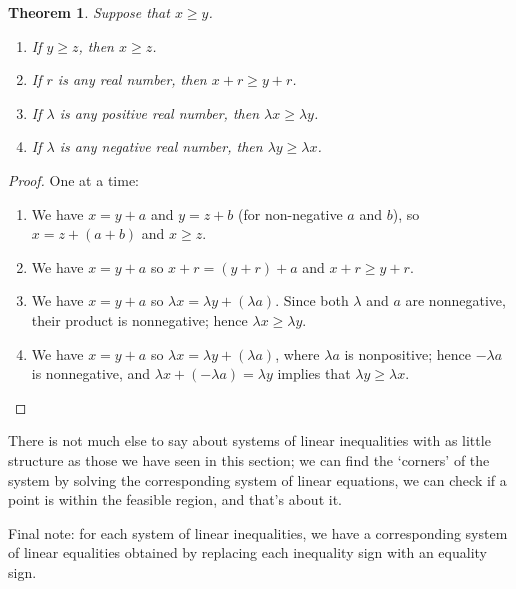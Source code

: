 \documentclass[a4paper,leqno]{article}
\numberwithin{equation}{section}
\newtheorem{thm}[equation]{Theorem}
\theoremstyle{definition}
\theoremstyle{remark}
\begin{document}
\begin{thm}
  Suppose that $ x \geq y $.
  \begin{enumerate}
    \item If $ y \geq z $, then $ x \geq z $.
    \item If $ r $ is any real number, then $ x + r \geq y + r $.
    \item If $ \lambda $ is any \emph{positive} real number, then $ \lambda x \geq \lambda y $.
    \item If $ \lambda $ is any \emph{negative} real number, then $ \lambda y \geq \lambda x $.
  \end{enumerate}
\end{thm}
\begin{proof}
  One at a time:
  \begin{enumerate}
    \item We have $ x = y + a $ and $ y = z + b $ (for non-negative $ a $ and $ b $), so $ x = z + (a + b) $ and $ x \geq z $.
    \item We have $ x = y + a $ so $ x + r = (y + r) + a $ and $ x + r \geq y + r $.
    \item We have $ x = y + a $ so $ \lambda x = \lambda y + (\lambda a) $. Since both $ \lambda $ and $ a $ are nonnegative, their
          product is nonnegative; hence $ \lambda x \geq \lambda y $.
    \item We have $ x = y + a $ so $ \lambda x = \lambda y + (\lambda a) $, where $ \lambda a $ is nonpositive; hence $ -\lambda a $ is
          nonnegative, and $ \lambda x + (-\lambda a) = \lambda y $ implies that $ \lambda y \geq \lambda x $.
  \end{enumerate}
\end{proof}

There is not much else to say about systems of linear inequalities with as little structure as those we have seen in this section; we can
find the `corners' of the system by solving the corresponding system of linear equations, we can check if a point is within the feasible
region, and that's about it.

Final note: for each system of linear inequalities, we have a corresponding system of linear equalities obtained by replacing each inequality
sign with an equality sign.
\end{document}
